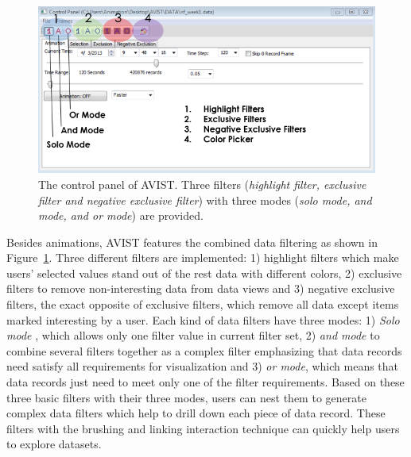 \begin{figure}[htb]
	\centering
	\includegraphics[width=1.0\linewidth]{pic/control.png}
	\parbox[t]{1.0\columnwidth}{\relax
	}
	\caption{\label{fig:control} The control panel of AVIST. Three filters (\textit{highlight filter, exclusive filter and negative exclusive filter}) with three modes (\textit{solo mode, and mode, and or mode}) are provided. }
\end{figure} 

Besides animations, AVIST features the combined data filtering as shown in Figure~\ref{fig:control}. Three different filters are implemented: 1) highlight filters which make users' selected values stand out of the rest data with different colors,  2) exclusive filters to remove non-interesting data from data views and 3) negative exclusive filters, the exact opposite of exclusive filters, which remove all data except items marked interesting by a user. Each kind of data filters have three  modes: 1) \emph{Solo mode} , which allows only one filter value in current filter set, 2) \emph{and mode}  to combine several filters together as a complex filter emphasizing that data records need satisfy all requirements for visualization and 3) \emph{or mode}, which means that data records just need to meet only one of the filter requirements. 
Based on these three basic filters with their three modes, users can nest them to generate complex data filters which help to drill down each piece of data record. These filters with the brushing and linking interaction technique can quickly help users to explore datasets. 

